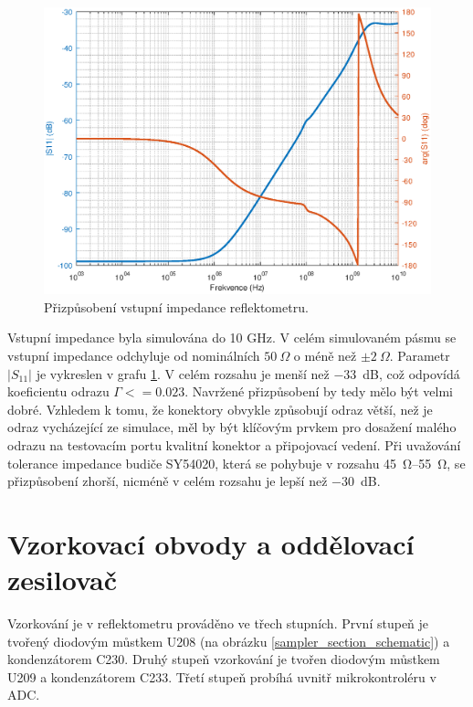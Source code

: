 \begin{figure}[htbp]
\includegraphics[width=\textwidth,keepaspectratio]{images/input_reflection.eps}\caption{Přizpůsobení vstupní impedance reflektometru.}\label{input_reflection}
\end{figure}

Vstupní impedance byla simulována do 10 GHz. V celém simulovaném pásmu se vstupní impedance odchyluje od nominálních $50~\Omega$ o méně než $\pm2~\Omega$. Parametr $\lvert S_{11} \rvert$ je vykreslen v grafu \ref{input_reflection}. V celém rozsahu je menší než \SI{-33}{\deci\bel}, což odpovídá koeficientu odrazu $\Gamma <= 0.023$. Navržené přizpůsobení by tedy mělo být velmi dobré. Vzhledem k tomu, že konektory obvykle způsobují odraz větší, než je odraz vycházející ze simulace, měl by být klíčovým prvkem pro dosažení malého odrazu na testovacím portu kvalitní konektor a připojovací vedení. Při uvažování tolerance impedance budiče SY54020, která se pohybuje v rozsahu \SIrange{45}{55}{\ohm}, se přizpůsobení zhorší, nicméně v celém rozsahu je lepší než \SI{-30}{\deci\bel}.

\section{Vzorkovací obvody a oddělovací zesilovač}
Vzorkování je v reflektometru prováděno ve třech stupních. První stupeň je tvořený diodovým můstkem U208 (na obrázku \ref{sampler_section_schematic}) a kondenzátorem C230. Druhý stupeň vzorkování je tvořen diodovým můstkem U209 a kondenzátorem C233. Třetí stupeň probíhá uvnitř mikrokontroléru v \acrshort{ADC}.

